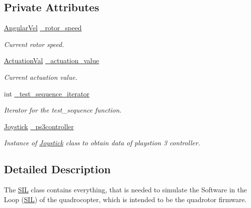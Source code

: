 \subsection*{\-Private \-Attributes}
\begin{DoxyCompactItemize}
\item 
\hypertarget{classSIL_a807e18b347926da1b8bfd375b31b4397}{\hyperlink{classAngularVel}{\-Angular\-Vel} \hyperlink{classSIL_a807e18b347926da1b8bfd375b31b4397}{\-\_\-rotor\-\_\-speed}}\label{classSIL_a807e18b347926da1b8bfd375b31b4397}

\begin{DoxyCompactList}\small\item\em \-Current rotor speed. \end{DoxyCompactList}\item 
\hypertarget{classSIL_acf01cad2432f30fa1bf3566c11400119}{\hyperlink{classActuationVal}{\-Actuation\-Val} \hyperlink{classSIL_acf01cad2432f30fa1bf3566c11400119}{\-\_\-actuation\-\_\-value}}\label{classSIL_acf01cad2432f30fa1bf3566c11400119}

\begin{DoxyCompactList}\small\item\em \-Current actuation value. \end{DoxyCompactList}\item 
\hypertarget{classSIL_a19b0b595318ed350fad37b9945489588}{int \hyperlink{classSIL_a19b0b595318ed350fad37b9945489588}{\-\_\-test\-\_\-sequence\-\_\-iterator}}\label{classSIL_a19b0b595318ed350fad37b9945489588}

\begin{DoxyCompactList}\small\item\em \-Iterator for the test\-\_\-sequence function. \end{DoxyCompactList}\item 
\hypertarget{classSIL_a9c92d49ff4644b8bb71f69cc55961a8a}{\hyperlink{classJoystick}{\-Joystick} \hyperlink{classSIL_a9c92d49ff4644b8bb71f69cc55961a8a}{\-\_\-ps3controller}}\label{classSIL_a9c92d49ff4644b8bb71f69cc55961a8a}

\begin{DoxyCompactList}\small\item\em \-Instance of \hyperlink{classJoystick}{\-Joystick} class to obtain data of playstion 3 controller. \end{DoxyCompactList}\end{DoxyCompactItemize}


\subsection{\-Detailed \-Description}
\-The \hyperlink{classSIL}{\-S\-I\-L} class contains everything, that is needed to simulate the \-Software in the \-Loop (\hyperlink{classSIL}{\-S\-I\-L}) of the quadrocopter, which is intended to be the quadrotor firmware. 

